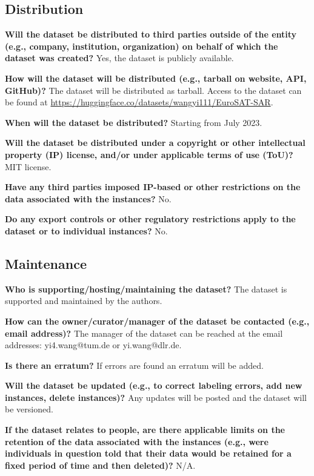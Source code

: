 \documentclass[lettersize,journal]{IEEEtran}
\begin{document}
\subsection{Distribution}

\textbf{Will the dataset be distributed to third parties outside of the entity (e.g., company, institution, organization) on behalf of which the dataset was created?} Yes, the dataset is publicly available.


\textbf{How will the dataset will be distributed (e.g., tarball on website, API, GitHub)?} The dataset will be distributed as tarball. Access to the dataset can be found at \url{https://huggingface.co/datasets/wangyi111/EuroSAT-SAR}.

\textbf{When will the dataset be distributed?} Starting from July 2023.

\textbf{Will the dataset be distributed under a copyright or other intellectual property (IP) license, and/or under applicable terms of use (ToU)? } MIT license.

\textbf{Have any third parties imposed IP-based or other restrictions on the data associated with the instances?} No.

\textbf{Do any export controls or other regulatory restrictions apply to the dataset or to individual
instances?} No.

\subsection{Maintenance} 

\textbf{Who is supporting/hosting/maintaining the dataset?} The dataset is supported and maintained by the authors.

\textbf{How can the owner/curator/manager of the dataset be contacted (e.g., email address)?} The manager of the dataset can be reached at the email addresses: yi4.wang@tum.de or yi.wang@dlr.de.

\textbf{Is there an erratum?} If errors are found an erratum will be added.

\textbf{Will the dataset be updated (e.g., to correct labeling errors, add new instances, delete instances)?} Any updates will be posted and the dataset will be versioned.

\textbf{If the dataset relates to people, are there applicable limits on the retention of the data associated with the instances (e.g., were individuals in question told that their data would be retained for a fixed period of time and then deleted)?} N/A.
\end{document}
